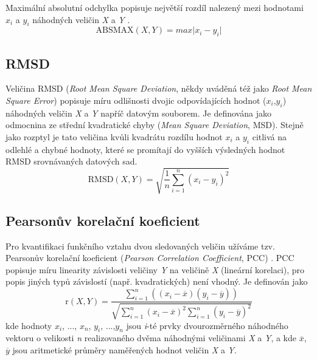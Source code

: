 Maximální absolutní odchylka popisuje největší rozdíl nalezený mezi hodnotami $x_i$ a $y_i$ náhodných veličin \textit{X} a \textit{Y} \cite{oxford}.
\begin{equation}
    \text{ABSMAX}(X,Y) = max \lvert x_i - y_i \rvert
\end{equation}

\subsection{RMSD}
Veličina RMSD (\textit{Root Mean Square Deviation}, někdy uváděná též jako \textit{Root Mean Square Error}) \cite{rmsd} popisuje míru odlišnosti dvojic odpovídajících hodnot ($x_i$,$y_i$) náhodných veličin \textit{X} a \textit{Y} napříč datovým souborem. Je definována jako odmocnina ze střední kvadratické chyby (\textit{Mean Square Deviation}, MSD). Stejně jako rozptyl je tato veličina kvůli kvadrátu rozdílu hodnot $x_i$ a $y_i$ citlivá na odlehlé a chybné hodnoty, které se promítají do vyšších výsledných hodnot RMSD srovnávaných datových sad. 
\begin{equation}
    \text{RMSD}(X,Y) = \sqrt{\frac{1}{n} \sum_{i=1}^n (x_i - y_i)^2} 
\end{equation}
\subsection{Pearsonův korelační koeficient}
Pro kvantifikaci funkčního vztahu dvou sledovaných veličin užíváme tzv. Pearsonův korelační koeficient (\textit{Pearson Correlation Coefficient}, PCC) \cite{PCC}. PCC popisuje míru linearity závislosti veličiny \textit{Y} na veličině \textit{X} (lineární korelaci), pro popis jiných typů závislostí (např. kvadratických) není vhodný. Je definován jako
\begin{equation}
\label{pearson}
    \text{r}(X,Y) = \frac
    {\sum_{i=1}^n ((x_i - \overline{x})(y_i - \overline{y}))}
    {\sqrt{\sum_{i=1}^n (x_i - \overline{x})^2 \sum_{i=1}^n (y_i - \overline{y})^2}}
\end{equation}
kde hodnoty $x_i$, ..., $x_n$, $y_i$, ...,$y_n$ jsou \textit{i}-té prvky dvourozměrného náhodného vektoru o velikosti \textit{n} realizovaného dvěma náhodnými veličinami \textit{X} a \textit{Y}, a kde $\overline{x}$, $\overline{y}$ jsou aritmetické průměry naměřených hodnot veličin \textit{X} a \textit{Y}. 

